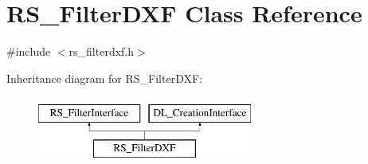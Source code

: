 \hypertarget{classRS__FilterDXF}{\section{R\-S\-\_\-\-Filter\-D\-X\-F Class Reference}
\label{classRS__FilterDXF}
}


{\ttfamily \#include $<$rs\-\_\-filterdxf.\-h$>$}

Inheritance diagram for R\-S\-\_\-\-Filter\-D\-X\-F\-:\begin{figure}[H]
\begin{center}
\leavevmode
\includegraphics[height=2.000000cm]{classRS__FilterDXF}
\end{center}
\end{figure}
